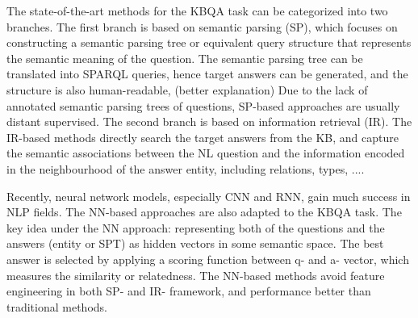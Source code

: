 

   The state-of-the-art methods for the KBQA task can be categorized into two branches.
   The first branch is based on semantic parsing (SP), which focuses on constructing
   a semantic parsing tree or equivalent query structure that represents the semantic meaning of the question.
   The semantic parsing tree can be translated into SPARQL queries, hence target answers can be generated,
   and the structure is also human-readable, (better explanation)
   Due to the lack of annotated semantic parsing trees of questions, 
   SP-based approaches are usually distant supervised.
   The second branch is based on information retrieval (IR).
   The IR-based methods directly
   search the target answers from the KB,
   and capture the semantic associations between the NL question and
   the information encoded in the neighbourhood of the answer entity, including relations, types, ....



Recently, neural network models, especially CNN and RNN, gain much success in NLP fields.
The NN-based approaches are also adapted to the KBQA task.
The key idea under the NN approach: representing both of the questions and the answers (entity or SPT)
as hidden vectors in some semantic space.
The best answer is selected by applying a scoring function between q- and a- vector,
which measures the similarity or relatedness.
The NN-based methods avoid feature engineering in both SP- and IR- framework,
and performance better than traditional methods.


